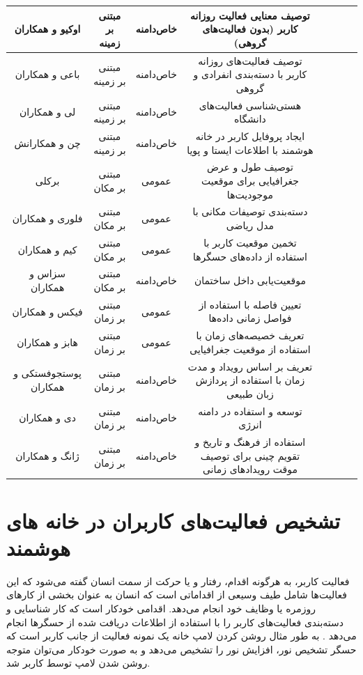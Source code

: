 \begin{table} [htp]
\begin{adjustbox}{width=\textwidth}
\begin{tabular}{|c|c|c|c|c|c|c|c|}
\hline
اوکیو و همکاران \cite{x232Z25} & مبتنی بر زمینه & خاص‌دامنه & توصیف معنایی فعالیت روزانه کاربر (بدون فعالیت‌های گروهی) \\
\hline
باعی و همکاران \cite{x232Z26} & مبتنی بر زمینه & خاص‌دامنه & توصیف فعالیت‌های روزانه کاربر با دسته‌بندی انفرادی و گروهی \\
\hline
لی و همکاران \cite{x232Z27} & مبتنی بر زمینه & خاص‌دامنه & هستی‌شناسی فعالیت‌های دانشگاه \\
\hline
چن و همکارانش \cite{x232Z2} & مبتنی بر زمینه & خاص‌دامنه & ایجاد پروفایل کاربر در خانه هوشمند با اطلاعات ایستا و پویا \\
\hline
برکلی \cite{x232Z30} & مبتنی بر مکان & عمومی & توصیف طول و عرض جغرافیایی برای موقعیت موجودیت‌ها \\
\hline
فلوری و همکاران \cite{x232Z31} & مبتنی بر مکان & عمومی & دسته‌بندی توصیفات مکانی با مدل ریاضی \\
\hline
کیم و همکاران \cite{x232Z32} & مبتنی بر مکان & عمومی & تخمین موقعیت کاربر با استفاده از داده‌های حسگرها \\
\hline
سزاس و همکاران \cite{x232Z33} & مبتنی بر مکان & خاص‌دامنه & موقعیت‌یابی داخل ساختمان \\
\hline
فیکس و همکاران \cite{x232Z40} & مبتنی بر زمان & عمومی & تعیین فاصله با استفاده از فواصل زمانی داده‌ها \\
\hline
هابز و همکاران \cite{x232Z4} & مبتنی بر زمان & عمومی & تعریف خصیصه‌های زمان با استفاده از موقعیت جغرافیایی \\
\hline
پوستجوفستکی و همکاران \cite{x232Z41} & مبتنی بر زمان & خاص‌دامنه & تعریف بر اساس رویداد و مدت زمان با استفاده از پردازش زبان طبیعی \\
\hline
دی و همکاران \cite{x232Z42} & مبتنی بر زمان & خاص‌دامنه & توسعه \cite{x232Z41} و استفاده در دامنه انرژی \\
\hline
ژانگ و همکاران \cite{x232Z43} & مبتنی بر زمان & خاص‌دامنه & استفاده از فرهنگ و تاریخ و تقویم چینی برای توصیف موقت رویدادهای زمانی \\
\hline
\end{tabular}
\end{adjustbox}
\end{table}

\section{تشخیص فعالیت‌های کاربران در خانه های هوشمند}\label{chapter:c32}

فعالیت کاربر، به هرگونه اقدام، رفتار و یا حرکت از سمت انسان گفته می‌شود که این فعالیت‌ها شامل طیف وسیعی از اقداماتی است که انسان به عنوان بخشی از کارهای روزمره یا وظایف خود انجام می‌دهد.  اقدامی خودکار است که کار شناسایی و دسته‌بندی فعالیت‌های کاربر را با استفاده از اطلاعات دریافت شده از حسگرها انجام می‌دهد \cite{x320}. به طور مثال روشن کردن لامپ خانه یک نمونه فعالیت از جانب کاربر است که حسگر تشخیص نور، افزایش نور را تشخیص می‌دهد و به صورت خودکار می‌توان متوجه روشن شدن لامپ توسط کاربر شد.

